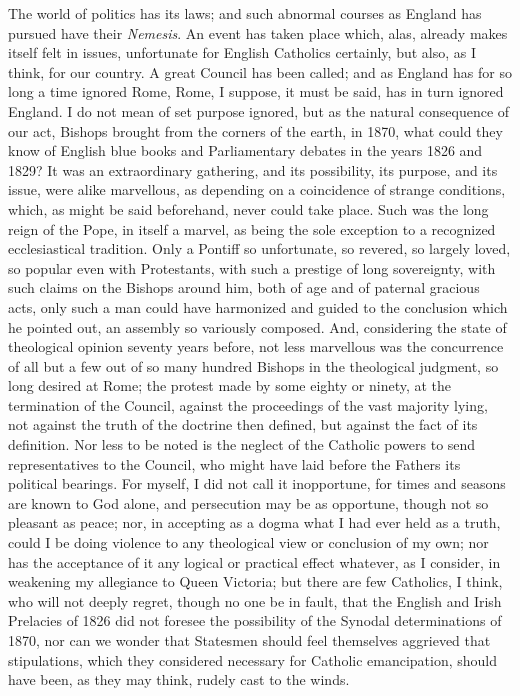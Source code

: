 The world of politics has its laws; and such abnormal courses as
England has pursued have their \emph{Nemesis}. An event has taken place
which, alas, already makes itself felt in issues, unfortunate for
English Catholics certainly, but also, as I think, for our country. A
great Council has been called; and as England has for so long a time
ignored Rome, Rome, I suppose, it must be said, has in turn ignored
England. I do not mean of set purpose ignored, but as the natural
consequence of our act, Bishops brought from the corners of the
earth, in 1870, what could they know of English blue books and
Parliamentary debates in the years 1826 and 1829? It was an
extraordinary gathering, and its possibility, its purpose, and its
issue, were alike marvellous, as depending on a coincidence of strange
conditions, which, as might be said beforehand, never could take place.
Such was the long reign of the Pope, in itself a marvel, as being the
sole exception to a recognized ecclesiastical tradition. Only a Pontiff
so unfortunate, so revered, so largely loved, so popular even with
Protestants, with such a prestige of long sovereignty, with such claims
on the Bishops around him, both of age and of paternal gracious acts,
only such a man could have harmonized and guided to the conclusion which
he pointed out, an assembly so variously composed. And, considering the
state of theological opinion seventy years before, not less marvellous
was the concurrence of all but a few out of so many hundred Bishops in
the theological judgment, so long desired at Rome; the protest made by
some eighty or ninety, at the termination of the Council, against the
proceedings of the vast majority lying, not against the truth of the
doctrine then defined, but against the fact of its definition. Nor less
to be noted is the neglect of the Catholic powers to send
representatives to the Council, who might have laid before the Fathers
its political bearings. For myself, I did not call it inopportune, for
times and seasons are known to God alone, and persecution may be as
opportune, though not so pleasant as peace; nor, in accepting as a dogma
what I had ever held as a truth, could I be doing violence to any
theological view or conclusion of my own; nor has the acceptance of it
any logical or practical effect whatever, as I consider, in weakening my
allegiance to Queen Victoria; but there are few Catholics, I think, who
will not deeply regret, though no one be in fault, that the English and
Irish Prelacies of 1826 did not foresee the possibility of the Synodal
determinations of 1870, nor can we wonder that Statesmen should feel
themselves aggrieved that stipulations, which they considered necessary
for Catholic emancipation, should have been, as they may think, rudely
cast to the winds.

